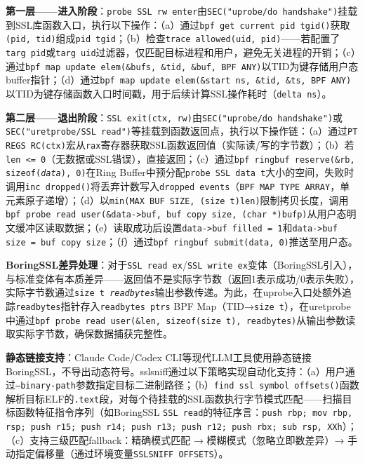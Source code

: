 \documentclass[a4paper]{ctexart}
\makeatletter
\renewcommand{\_}{%
  \ifmmode
    \nfss@text{\textunderscore}%
  \else
    \textunderscore\discretionary{}{}{}%
  \fi}
\makeatother
\begin{document}
\textbf{第一层——进入阶段}：\texttt{probe\_SSL\_rw\_enter}由\texttt{SEC("uprobe/do\_handshake")}挂载到SSL库函数入口，执行以下操作：（a）通过\texttt{bpf\_get\_current\_pid\_tgid()}获取\texttt{(pid, tid)}组成\texttt{pid\_tgid}；（b）检查\texttt{trace\_allowed(uid, pid)}——若配置了\texttt{targ\_pid}或\texttt{targ\_uid}过滤器，仅匹配目标进程和用户，避免无关进程的开销；（c）通过\texttt{bpf\_map\_update\_elem(\&bufs, \&tid, \&buf, BPF\_ANY)}以TID为键存储用户态buffer指针；（d）通过\texttt{bpf\_map\_update\_elem(\&start\_ns, \&tid, \&ts, BPF\_ANY)}以TID为键存储函数入口时间戳，用于后续计算SSL操作耗时（\texttt{delta\_ns}）。


\textbf{第二层——退出阶段}：\texttt{SSL\_exit(ctx, rw)}由\texttt{SEC("uprobe/do\_handshake")}或\texttt{SEC("uretprobe/SSL\_read")}等挂载到函数返回点，执行以下操作链：（a）通过\texttt{PT\_REGS\_RC(ctx)}宏从\texttt{rax}寄存器获取SSL函数返回值（实际读/写的字节数）；（b）若\texttt{len <= 0}（无数据或SSL错误），直接返回；（c）通过\texttt{bpf\_ringbuf\_reserve(\&rb, sizeof(\textit{data}), 0)}在Ring Buffer中预分配\texttt{probe\_SSL\_data\_t}大小的空间，失败时调用\texttt{inc\_dropped()}将丢弃计数写入\texttt{dropped\_events}（\texttt{BPF\_MAP\_TYPE\_ARRAY}，单元素原子递增）；（d）以\texttt{min(MAX\_BUF\_SIZE, (size\_t)len)}限制拷贝长度，调用\texttt{bpf\_probe\_read\_user(\&data->buf, buf\_copy\_size, (char *)bufp)}从用户态明文缓冲区读取数据；（e）读取成功后设置\texttt{data->buf\_filled = 1}和\texttt{data->buf\_size = buf\_copy\_size}；（f）通过\texttt{bpf\_ringbuf\_submit(data, 0)}推送至用户态。


\textbf{BoringSSL差异处理}：对于\texttt{SSL\_read\_ex}/\texttt{SSL\_write\_ex}变体（BoringSSL引入），与标准变体有本质差异——返回值不是实际字节数（返回1表示成功/0表示失败），实际字节数通过\texttt{size\_t \textit{readbytes}}输出参数传递。为此，在uprobe入口处额外追踪\texttt{readbytes}指针存入\texttt{readbytes\_ptrs} BPF Map（TID→\texttt{size\_t}），在uretprobe中通过\texttt{bpf\_probe\_read\_user(\&len, sizeof(size\_t), readbytes)}从输出参数读取实际字节数，确保数据捕获完整性。


\textbf{静态链接支持}：Claude Code/Codex CLI等现代LLM工具使用静态链接BoringSSL，不导出动态符号。sslsniff通过以下策略实现自动化支持：（a）用户通过\texttt{--binary-path}参数指定目标二进制路径；（b）\texttt{find\_ssl\_symbol\_offsets()}函数解析目标ELF的\texttt{.text}段，对每个待挂载的SSL函数执行字节模式匹配——扫描目标函数特征指令序列（如BoringSSL \texttt{SSL\_read}的特征序言：\texttt{push rbp; mov rbp, rsp; push r15; push r14; push r13; push r12; push rbx; sub rsp, XXh}）；（c）支持三级匹配fallback：精确模式匹配 → 模糊模式（忽略立即数差异）→ 手动指定偏移量（通过环境变量\texttt{SSLSNIFF\_OFFSETS}）。
\end{document}
